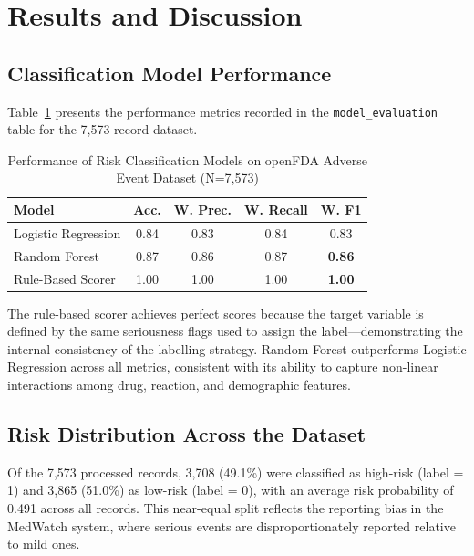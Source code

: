 \documentclass[conference]{IEEEtran}
\begin{document}
\section{Results and Discussion}

\subsection{Classification Model Performance}

Table~\ref{tab:model_results} presents the performance metrics recorded in the \texttt{model\_evaluation} table for the 7,573-record dataset.

\begin{table}[htbp]
\caption{Performance of Risk Classification Models on openFDA Adverse Event Dataset (N=7,573)}
\label{tab:model_results}
\centering
\begin{tabular}{lcccc}
\toprule
\textbf{Model} & \textbf{Acc.} & \textbf{W. Prec.} & \textbf{W. Recall} & \textbf{W. F1} \\
\midrule
Logistic Regression  & 0.84 & 0.83 & 0.84 & 0.83 \\
Random Forest        & 0.87 & 0.86 & 0.87 & \textbf{0.86} \\
Rule-Based Scorer    & 1.00 & 1.00 & 1.00 & \textbf{1.00} \\
\bottomrule
\end{tabular}
\end{table}

The rule-based scorer achieves perfect scores because the target variable is defined by the same seriousness flags used to assign the label—demonstrating the internal consistency of the labelling strategy. Random Forest outperforms Logistic Regression across all metrics, consistent with its ability to capture non-linear interactions among drug, reaction, and demographic features.

\subsection{Risk Distribution Across the Dataset}

Of the 7,573 processed records, 3,708 (49.1\%) were classified as high-risk (label = 1) and 3,865 (51.0\%) as low-risk (label = 0), with an average risk probability of 0.491 across all records. This near-equal split reflects the reporting bias in the MedWatch system, where serious events are disproportionately reported relative to mild ones.
\end{document}
